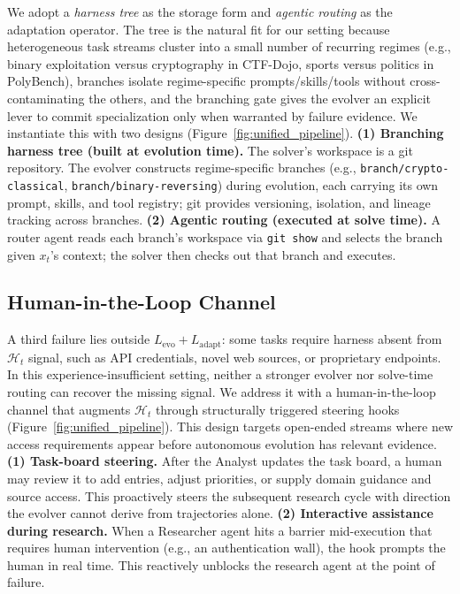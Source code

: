 \documentclass[11pt]{article}
\theoremstyle{plain}
\newcommand{\Levo}{L_{\text{evo}}}
\newcommand{\Ladapt}{L_{\text{adapt}}}
\newcommand{\Hist}{\mathcal{H}_t}
\begin{document}
We adopt a \emph{harness tree} as the storage form and \emph{agentic routing} as the adaptation operator. The tree is the natural fit for our setting because heterogeneous task streams cluster into a small number of recurring regimes (e.g., binary exploitation versus cryptography in CTF-Dojo, sports versus politics in PolyBench), branches isolate regime-specific prompts/skills/tools without cross-contaminating the others, and the branching gate gives the evolver an explicit lever to commit specialization only when warranted by failure evidence. We instantiate this with two designs (Figure~\ref{fig:unified_pipeline}). \textbf{(1) Branching harness tree (built at evolution time).} The solver's workspace is a git repository. The evolver constructs regime-specific branches (e.g., \texttt{branch/crypto-classical}, \texttt{branch/binary-reversing}) during evolution, each carrying its own prompt, skills, and tool registry; git provides versioning, isolation, and lineage tracking across branches. \textbf{(2) Agentic routing (executed at solve time).} A router agent reads each branch's workspace via \texttt{git show} and selects the branch given $x_t$'s context; the solver then checks out that branch and executes.

\subsection{Human-in-the-Loop Channel}
\label{sec:method-hitl}

A third failure lies outside $\Levo + \Ladapt$: some tasks require harness absent from $\Hist$ signal, such as API credentials, novel web sources, or proprietary endpoints. In this experience-insufficient setting, neither a stronger evolver nor solve-time routing can recover the missing signal. We address it with a human-in-the-loop channel that augments $\Hist$ through structurally triggered steering hooks (Figure~\ref{fig:unified_pipeline}). This design targets open-ended streams where new access requirements appear before autonomous evolution has relevant evidence.
\noindent\textbf{(1) Task-board steering.}
After the Analyst updates the task board, a human may review it to add entries, adjust priorities, or supply domain guidance and source access. This proactively steers the subsequent research cycle with direction the evolver cannot derive from trajectories alone.
\noindent\textbf{(2) Interactive assistance during research.}
When a Researcher agent hits a barrier mid-execution that requires human intervention (e.g., an authentication wall), the hook prompts the human in real time. This reactively unblocks the research agent at the point of failure.
\end{document}
